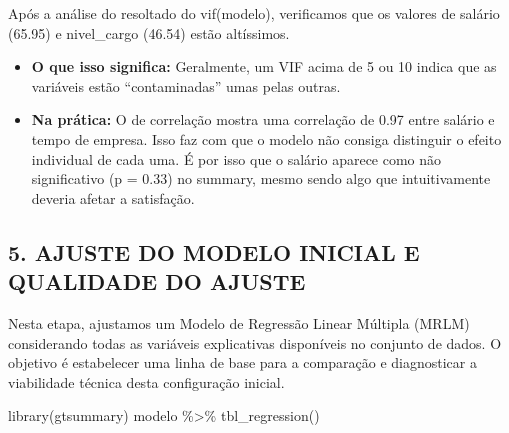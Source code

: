 \documentclass[
  letterpaper,
  DIV=11,
  numbers=noendperiod]{scrartcl}
\newenvironment{Shaded}{\begin{snugshade}}{\end{snugshade}}
\newcommand{\FunctionTok}[1]{\textcolor[rgb]{0.28,0.35,0.67}{#1}}
\newcommand{\NormalTok}[1]{\textcolor[rgb]{0.00,0.23,0.31}{#1}}
\newcommand{\SpecialCharTok}[1]{\textcolor[rgb]{0.37,0.37,0.37}{#1}}
\begin{document}
Após a análise do resoltado do vif(modelo), verificamos que os valores
de salário (65.95) e nivel\_cargo (46.54) estão altíssimos.

\begin{itemize}
\item
  \textbf{O que isso significa:} Geralmente, um VIF acima de 5 ou 10
  indica que as variáveis estão ``contaminadas'' umas pelas outras.
\item
  \textbf{Na prática:} O de correlação mostra uma correlação de 0.97
  entre salário e tempo de empresa. Isso faz com que o modelo não
  consiga distinguir o efeito individual de cada uma. É por isso que o
  salário aparece como não significativo (p = 0.33) no summary, mesmo
  sendo algo que intuitivamente deveria afetar a satisfação.
\end{itemize}

\subsection{5. AJUSTE DO MODELO INICIAL E QUALIDADE DO
AJUSTE}\label{ajuste-do-modelo-inicial-e-qualidade-do-ajuste}

Nesta etapa, ajustamos um Modelo de Regressão Linear Múltipla (MRLM)
considerando todas as variáveis explicativas disponíveis no conjunto de
dados. O objetivo é estabelecer uma linha de base para a comparação e
diagnosticar a viabilidade técnica desta configuração inicial.

\begin{Shaded}
\begin{Highlighting}[]
\FunctionTok{library}\NormalTok{(gtsummary)}
\NormalTok{modelo }\SpecialCharTok{\%\textgreater{}\%} \FunctionTok{tbl\_regression}\NormalTok{()}
\end{Highlighting}
\end{Shaded}
\end{document}
